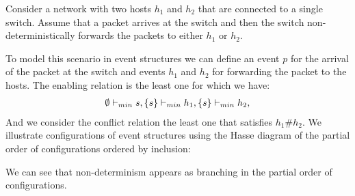 \begin{example}
    Consider a network with two hosts $h_1$ and $h_2$ that are
    connected to a single switch.
    Assume that a packet arrives at the switch and then the switch
    non-deterministically forwards the packets to either $h_1$ or $h_2$.
    \begin{center}
    \end{center}
    To model this scenario in event structures we can define an event
    $p$ for the arrival of the packet at the switch and events $h_1$
    and $h_2$ for forwarding the packet to the hosts.
    The enabling relation is the least one for which we have:
    \begin{align*}
        \emptyset \vdash_{min} s,
        \{s\} \vdash_{min} h_1,
        \{s\} \vdash_{min} h_2,
    \end{align*}
    And we consider the conflict relation the least one that satisfies
    $h_1 \# h_2$.
    We illustrate configurations of event structures using the Hasse diagram of
    the partial order of configurations ordered by inclusion:
    \begin{center}
    \end{center}
    We can see that non-determinism appears as branching in the partial order of configurations.
\end{example}


